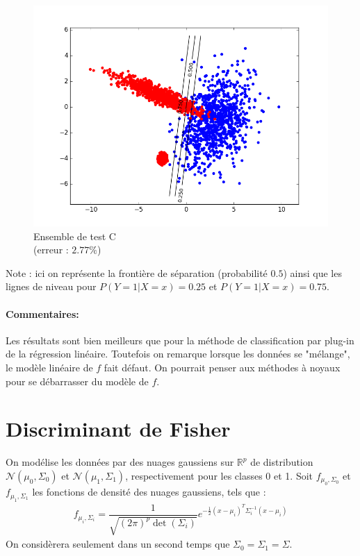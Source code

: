 \documentclass[paper=a4, fontsize=11pt]{article}
\begin{document}
\begin{figure}[h]
 \begin{minipage}[b]{.3\linewidth}
  \begin{center}
  \includegraphics[scale=0.25]{figures/log_reg_C_test.png}
  \caption*{Ensemble de test C  \\ (erreur : $2.77\%$)}
   \end{center}
 \end{minipage}
\end{figure}

Note : ici on représente la frontière de séparation (probabilité $0.5$) ainsi que les lignes de niveau pour $P(Y=1|X=x) = 0.25$ et $P(Y=1|X=x) = 0.75$.
\paragraph{Commentaires:\\}
Les résultats sont bien meilleurs que pour la méthode de classification par plug-in de la régression linéaire. Toutefois on remarque lorsque les données se "mélange", le modèle linéaire de $f$ fait défaut. On pourrait penser aux méthodes à noyaux pour se débarrasser du modèle de $f$.

\section*{Discriminant de Fisher}
On modélise les données par des nuages gaussiens sur $\mathbb{R}^{p}$ de distribution $\mathcal{N}(\mu_0,\Sigma_0)$ et $\mathcal{N}(\mu_1,\Sigma_1)$, respectivement pour les classes 0 et 1. Soit $f_{\mu_0,\Sigma_0}$ et $f_{\mu_1,\Sigma_1}$ les fonctions de densité des nuages gaussiens, tels que :
\begin{align*}
f_{\mu_i,\Sigma_i}=\dfrac{1}{\sqrt{(2\pi)^{p}\det(\Sigma_i)}}e^{-\frac{1}{2}(x-\mu_i)^{T}\Sigma_{i}^{-1}(x-\mu_i)}
\end{align*}
On considèrera seulement dans un second temps que $\Sigma_0 = \Sigma_1 = \Sigma$.
\end{document}
